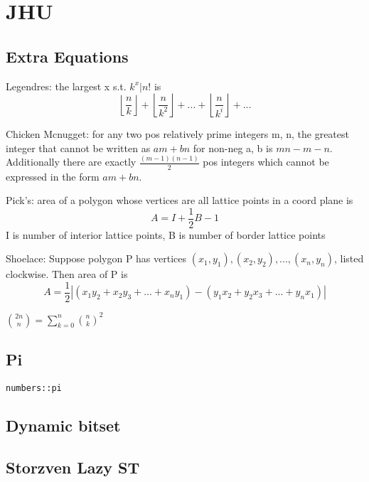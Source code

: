 \chapter{JHU}

\section{Extra Equations}
Legendres: the largest x s.t. $k^{x} | n!$ is
\[ \left \lfloor{\frac{n}{k}}\right \rfloor + \left \lfloor{\frac{n}{k^{2}}}\right \rfloor + ... + \left \lfloor{\frac{n}{k^{i}}}\right \rfloor + ...\]

Chicken Mcnugget: for any two pos relatively prime integers m, n, the greatest integer that cannot be written as $am+bn$ for non-neg a, b is $mn-m-n$. Additionally
there are exactly $\frac{(m-1)(n-1)}{2}$ pos integers which cannot be expressed in the form $am+bn$.

Pick's: area of a polygon whose vertices are all lattice points in a coord plane is 
\[ A = I + \frac{1}{2}B-1\]
I is number of interior lattice points, B is number of border lattice points

Shoelace: Suppose polygon P has vertices $(x_1, y_1), (x_2, y_2), ..., (x_n, y_n)$, listed clockwise. Then area of P is
\[ A = \frac{1}{2}|(x_1y_2 + x_2y_3 + ... + x_ny_1) - (y_1x_2+y_2x_3+...+y_nx_1)|\]

${2n \choose n} = \sum_{k=0}^{n}{n \choose k}^{2}$


\section{Pi}
\lstinline|numbers::pi|

\section{Dynamic bitset}

\section{Storzven Lazy ST}
